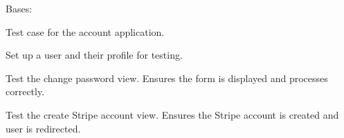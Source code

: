 \documentclass[letterpaper,10pt,english]{sphinxmanual}
\begin{document}
\begin{fulllineitems}
\label{\detokenize{modules/tests:account.tests.AccountTests}}
\pysigstartsignatures
{}
\pysigstopsignatures
\sphinxAtStartPar
Bases: 

\sphinxAtStartPar
Test case for the account application.

\begin{fulllineitems}
\label{\detokenize{modules/tests:account.tests.AccountTests.setUp}}
\pysigstartsignatures
{}
\pysigstopsignatures
\sphinxAtStartPar
Set up a user and their profile for testing.

\end{fulllineitems}


\begin{fulllineitems}
\label{\detokenize{modules/tests:account.tests.AccountTests.test_change_password_view}}
\pysigstartsignatures
{}
\pysigstopsignatures
\sphinxAtStartPar
Test the change password view. Ensures the form is displayed and processes correctly.

\end{fulllineitems}


\begin{fulllineitems}
\label{\detokenize{modules/tests:account.tests.AccountTests.test_create_stripe_account_view}}
\pysigstartsignatures
{}
\pysigstopsignatures
\sphinxAtStartPar
Test the create Stripe account view. Ensures the Stripe account is created and user is redirected.


\end{fulllineitems}
\end{fulllineitems}
\end{document}
